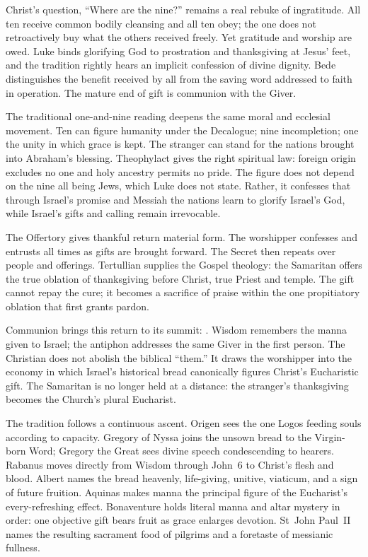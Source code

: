 Christ's question, ``Where are the nine?'' remains a real rebuke of
ingratitude. All ten receive common bodily cleansing and all ten obey; the one
does not retroactively buy what the others received freely. Yet gratitude and
worship are owed. Luke binds glorifying God to prostration and thanksgiving at
Jesus' feet, and the tradition rightly hears an implicit confession of divine
dignity. Bede distinguishes the benefit received by all from the saving word
addressed to faith in operation. The mature end of gift is communion with the
Giver.

The traditional one-and-nine reading deepens the same moral and ecclesial
movement. Ten can figure humanity under the Decalogue; nine incompletion; one
the unity in which grace is kept. The stranger can stand for the nations
brought into Abraham's blessing. Theophylact gives the right spiritual law:
foreign origin excludes no one and holy ancestry permits no pride. The figure
does not depend on the nine all being Jews, which Luke does not state. Rather, it
confesses that through Israel's promise and Messiah the nations learn to
glorify Israel's God, while Israel's gifts and calling remain irrevocable.

The Offertory gives thankful return material form. The worshipper confesses
 and entrusts all times as gifts are brought forward.
The Secret then repeats  over people and offerings. Tertullian
supplies the Gospel theology: the Samaritan offers the true oblation of
thanksgiving before Christ, true Priest and temple. The gift cannot repay the
cure; it becomes a sacrifice of praise within the one propitiatory oblation
that first grants pardon.

Communion brings this return to its summit: . Wisdom remembers the manna given to Israel; the antiphon addresses the
same Giver in the first person. The Christian  does not abolish
the biblical ``them.'' It draws the worshipper into the economy in which
Israel's historical bread canonically figures Christ's Eucharistic gift. The
Samaritan is no longer held at a distance: the stranger's thanksgiving becomes
the Church's plural Eucharist.

The tradition follows a continuous ascent. Origen sees the one Logos feeding
souls according to capacity. Gregory of Nyssa joins the unsown bread to the
Virgin-born Word; Gregory the Great sees divine speech condescending to hearers.
Rabanus moves directly from Wisdom through John~6 to Christ's flesh and blood.
Albert names the bread heavenly, life-giving, unitive, viaticum, and a sign of
future fruition. Aquinas makes manna the principal figure of the Eucharist's
every-refreshing effect. Bonaventure holds literal manna and altar mystery in
order: one objective gift bears fruit as grace enlarges devotion. St~John
Paul~II names the resulting sacrament food of pilgrims and a foretaste of
messianic fullness.


